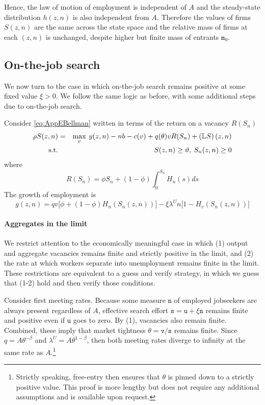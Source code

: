 Hence, the law of motion of employment is independent of $A$ and the steady-state distribution $h(z,n)$ is also independent from $A$. Therefore the values of firms $S(z,n)$ are the same across the state space and the relative mass of firms at each $(z,n)$ is unchanged, despite higher but finite mass of entrants $\mathtt{m}_0$.

\subsection{On-the-job search \label{app:hopenhayn_ojs_fattail}}

We now turn to the case in which on-the-job search remains positive at some
fixed value $\xi > 0$. We follow the same logic as
before, with some additional steps due to on-the-job search.

Consider \eqref{eq:AppEBellman} written in terms of the return on a vacancy $R(S_n)$
\begin{eqnarray*}
\rho S(z,n) &=& \max_v \: y(z,n) - n b - c(v) + q(\theta) v R(S_n)  + \left(\mathbb{L} S \right)(z,n) \notag  \\
\text{s.t.} && S(z,n) \geq \vartheta  ,\:  S_n(z,n) \geq 0 \notag
\end{eqnarray*}
where
\begin{equation}\label{eq:Rappendix}
R(S_{n})=\phi S_{n}+(1-\phi )\int_{0}^{S_{n}}H_{n}(s)ds
\end{equation}
The growth of employment is
\begin{equation}\label{eq:gappendix}
g(z,n)=qv\Big[ \phi +\left(1-\phi\right)H_{n}\left(S_{n}(z,n)\right)\Big] -\xi
\lambda^{U}n\Big[1-H_{v}\left(S_{n}(z,n)\right)\Big]
\end{equation}

\paragraph{Aggregates in the limit}
We restrict attention to the economically meaningful case in which (1) output and aggregate vacancies remains finite and strictly positive in the limit, and (2) the rate at which workers separate into unemployment remains finite in the limit. These restrictions are equivalent to a guess and verify strategy, in which we guess that (1-2) hold and then verify those conditions.

Consider first meeting rates.
Because some measure $\mathtt{n}$ of employed jobseekers are always present regardless of $A$, effective search effort $\mathtt{s}= \mathtt{u} + \xi\mathtt{n}$ remains finite and positive even if $\mathtt{u}$ goes to zero.
By (1), vacancies also remain finite.
Combined, these imply that market tightness $\theta =\mathtt{v}/\mathtt{s}$ remains finite.
Since $q = A\theta^{-\beta}$ and $\lambda^U = A\theta^{1-\beta}$, then both meeting rates diverge to infinity at the same rate as $A$.\footnote{
    Strictly speaking, free-entry then ensures that $\theta$ is pinned down to a strictly positive value.
    This proof is more lengthy but does not require any additional assumptions and is available upon request.}

